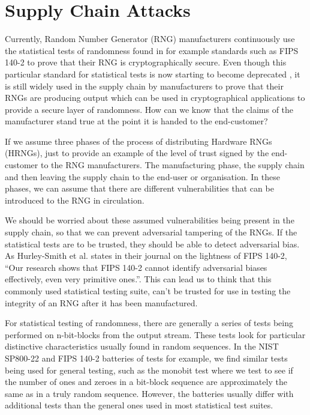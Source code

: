 \documentclass[]{final_report}
\begin{document}
\newpage
\section*{Supply Chain Attacks} 
\label{SupplyChainAttacksReport}

\par{Currently, Random Number Generator (RNG) manufacturers continuously use the statistical tests of randomness found in for example standards such as FIPS 140-2 to prove that their RNG is cryptographically secure. Even though this particular standard for statistical tests is now starting to become deprecated \cite{NIST:2019}, it is still widely used in the supply chain by manufacturers to prove that their RNGs are producing output which can be used in cryptographical applications to provide a secure layer of randomness. How can we know that the claims of the manufacturer stand true at the point it is handed to the end-customer?}

\par{If we assume three phases of the process of distributing Hardware RNGs (HRNGs), just to provide an example of the level of trust signed by the end-customer to the RNG manufacturers. The manufacturing phase, the supply chain and then leaving the supply chain to the end-user or organisation. In these phases, we can assume that there are different vulnerabilities that can be introduced to the RNG in circulation.}

\par{We should be worried about these assumed vulnerabilities being present in the supply chain, so that we can prevent adversarial tampering of the RNGs. If the statistical tests are to be trusted, they should be able to detect adversarial bias. As Hurley-Smith et al. \cite{Smith:2020} states in their journal on the lightness of FIPS 140-2, “Our research shows that FIPS 140-2 cannot identify adversarial biases effectively, even very primitive ones.”. This can lead us to think that this commonly used statistical testing suite, can’t be trusted for use in testing the integrity of an RNG after it has been manufactured.}

\par{For statistical testing of randomness, there are generally a series of tests being performed on n-bit-blocks from the output stream. These tests look for particular distinctive characteristics usually found in random sequences. In the NIST SP800-22 and FIPS 140-2 batteries of tests for example, we find similar \cite{Smith:2020}\cite{Rukhin:2010} tests being used for general testing, such as the monobit test where we test to see if the number of ones and zeroes in a bit-block sequence are approximately the same as in a truly random sequence. However, the batteries usually differ with additional tests than the general ones used in most statistical test suites.}
\end{document}
